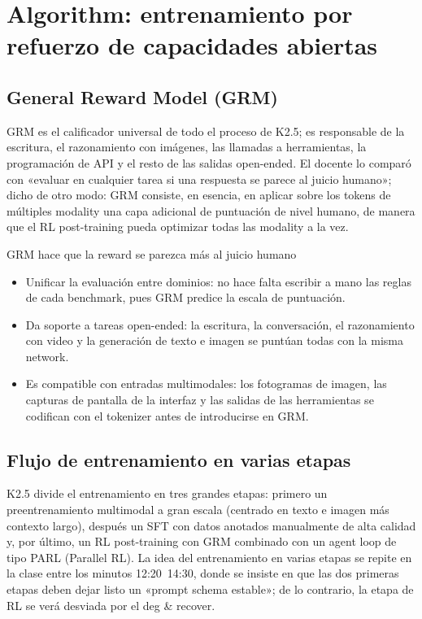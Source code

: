 \section{Algorithm: entrenamiento por refuerzo de capacidades abiertas}

\subsection{General Reward Model (GRM)}
GRM es el calificador universal de todo el proceso de K2.5; es responsable de la escritura, el razonamiento con imágenes, las llamadas a herramientas, la programación de API y el resto de las salidas open-ended. El docente lo comparó con «evaluar en cualquier tarea si una respuesta se parece al juicio humano»; dicho de otro modo: GRM consiste, en esencia, en aplicar sobre los tokens de múltiples modality una capa adicional de puntuación de nivel humano, de manera que el RL post-training pueda optimizar todas las modality a la vez.

\begin{knowledgebox}{GRM hace que la reward se parezca más al juicio humano}
\begin{itemize}
    \item Unificar la evaluación entre dominios: no hace falta escribir a mano las reglas de cada benchmark, pues GRM predice la escala de puntuación.
    \item Da soporte a tareas open-ended: la escritura, la conversación, el razonamiento con video y la generación de texto e imagen se puntúan todas con la misma network.
    \item Es compatible con entradas multimodales: los fotogramas de imagen, las capturas de pantalla de la interfaz y las salidas de las herramientas se codifican con el tokenizer antes de introducirse en GRM.
\end{itemize}
\end{knowledgebox}

\subsection{Flujo de entrenamiento en varias etapas}
K2.5 divide el entrenamiento en tres grandes etapas: primero un preentrenamiento multimodal a gran escala (centrado en texto e imagen más contexto largo), después un SFT con datos anotados manualmente de alta calidad y, por último, un RL post-training con GRM combinado con un agent loop de tipo PARL (Parallel RL). La idea del entrenamiento en varias etapas se repite en la clase entre los minutos 12:20~14:30, donde se insiste en que las dos primeras etapas deben dejar listo un «prompt schema estable»; de lo contrario, la etapa de RL se verá desviada por el deg \& recover.

